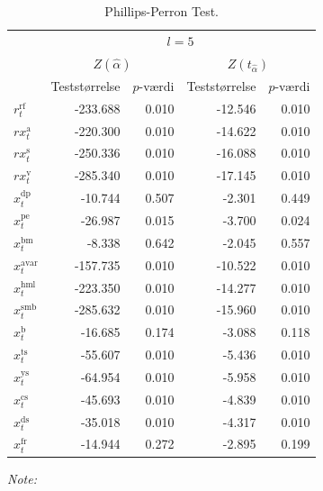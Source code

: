 \documentclass[
  a4paper,
  oneside]{memoir}
\begin{document}
\begin{table}[!h]

\caption{\label{tab:STAT-PP}Phillips-Perron Test.}
\centering
\begin{threeparttable}
\begin{tabular}[t]{lrrrr}
\toprule
\multicolumn{1}{c}{ } & \multicolumn{4}{c}{$l=5$} \\
\cmidrule(l{3pt}r{3pt}){2-5}
\multicolumn{1}{c}{ } & \multicolumn{2}{c}{$Z(\hat{\alpha})$} & \multicolumn{2}{c}{$Z(t_{\hat{\alpha}})$} \\
\cmidrule(l{3pt}r{3pt}){2-3} \cmidrule(l{3pt}r{3pt}){4-5}
  & Teststørrelse & $p$-værdi & Teststørrelse & $p$-værdi\\
\midrule
\rowcolor{gray!6}  $r_t^{\text{rf}}$ & -233.688 & 0.010 & -12.546 & 0.010\\
$rx_t^{\text{a}}$ & -220.300 & 0.010 & -14.622 & 0.010\\
\rowcolor{gray!6}  $rx_t^{\text{s}}$ & -250.336 & 0.010 & -16.088 & 0.010\\
$rx_t^{\text{v}}$ & -285.340 & 0.010 & -17.145 & 0.010\\
\rowcolor{gray!6}  $x_t^{\text{dp}}$ & -10.744 & 0.507 & -2.301 & 0.449\\
$x_t^{\text{pe}}$ & -26.987 & 0.015 & -3.700 & 0.024\\
\rowcolor{gray!6}  $x_t^{\text{bm}}$ & -8.338 & 0.642 & -2.045 & 0.557\\
$x_t^{\text{avar}}$ & -157.735 & 0.010 & -10.522 & 0.010\\
\rowcolor{gray!6}  $x_t^{\text{hml}}$ & -223.350 & 0.010 & -14.277 & 0.010\\
$x_t^{\text{smb}}$ & -285.632 & 0.010 & -15.960 & 0.010\\
\rowcolor{gray!6}  $x_t^{\text{b}}$ & -16.685 & 0.174 & -3.088 & 0.118\\
$x_t^{\text{ts}}$ & -55.607 & 0.010 & -5.436 & 0.010\\
\rowcolor{gray!6}  $x_t^{\text{ys}}$ & -64.954 & 0.010 & -5.958 & 0.010\\
$x_t^{\text{cs}}$ & -45.693 & 0.010 & -4.839 & 0.010\\
\rowcolor{gray!6}  $x_t^{\text{ds}}$ & -35.018 & 0.010 & -4.317 & 0.010\\
$x_t^{\text{fr}}$ & -14.944 & 0.272 & -2.895 & 0.199\\
\bottomrule
\end{tabular}
\begin{tablenotes}
\item \textit{Note: } 

\end{tablenotes}
\end{threeparttable}
\end{table}
\end{document}
